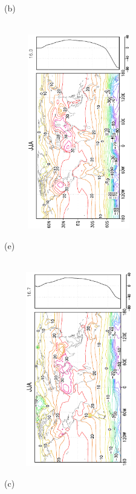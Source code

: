 \documentclass[12pt,a4paper,twoside,openright,headinclude,liststotoc,bibtotoc]{scrreprt}
\begin{document}
\begin{figure}[H]
{}
\parbox{8.5cm}{\hspace{0.50cm}\begin{scriptsize}(b)\end{scriptsize} \vspace{-0.7cm} \\
\includegraphics[height=8.5cm,width=6.5cm,angle=-90]
{eps/zonalcelysmtemp139JJA.eps}
}
\parbox{8.5cm}{\hspace{0.25cm}\begin{scriptsize}(e)\end{scriptsize} \vspace{-0.7cm} \\
\includegraphics[height=8.5cm,width=6.5cm,angle=-90]
{eps/zonalt21celysmsoil139JJA.eps}
}
\parbox{8.5cm}{\hspace{0.50cm}\begin{scriptsize}(c)\end{scriptsize} \vspace{-0.7cm} \\
}
\end{figure}
\end{document}
